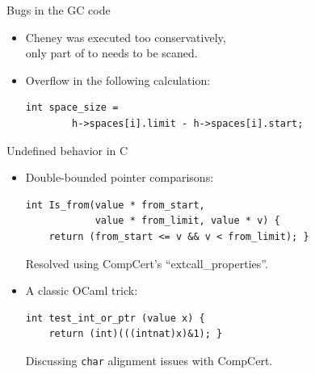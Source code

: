 \documentclass[professionalfonts, xcolor=table]{beamer}
\begin{document}
\begin{frame}[fragile]{Bugs in the GC code}
  \begin{itemize}
  \item Cheney was executed too conservatively,\\ only part of
    \textsf{to} needs to be scaned.
  \pause
\item Overflow in the following calculation:\\
\begin{verbatim}
int space_size = 
        h->spaces[i].limit - h->spaces[i].start;  
\end{verbatim}
  \end{itemize}
\end{frame}

\begin{frame}[fragile]{Undefined behavior in C}
  
  \begin{itemize}
  \item Double-bounded pointer comparisons:
    \begin{Verbatim}
int Is_from(value * from_start,
            value * from_limit, value * v) {
    return (from_start <= v && v < from_limit); }
    \end{Verbatim}
    Resolved using CompCert's ``extcall\_properties''.
    \pause
  \item A classic OCaml trick:
    \begin{Verbatim}
int test_int_or_ptr (value x) {
    return (int)(((intnat)x)&1); }
    \end{Verbatim}
    Discussing \texttt{char} alignment issues with CompCert.
  \end{itemize}
\end{frame}


\end{document}
